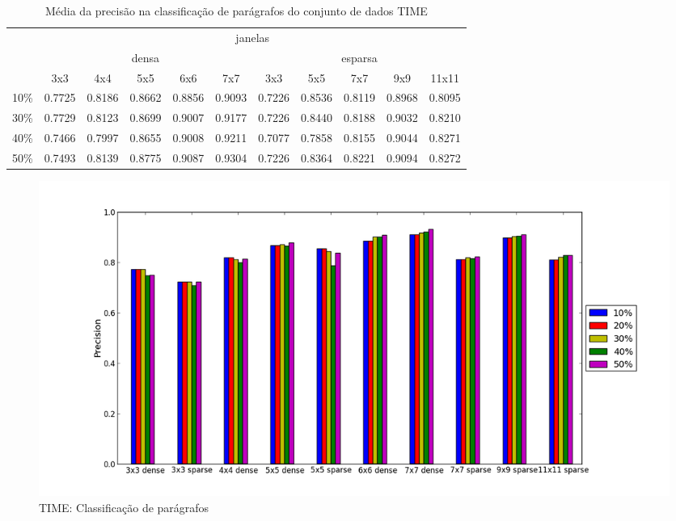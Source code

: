 \documentclass[a4paper,11pt]{article}
\begin{document}
  \begin{center}
    \begin{table}[p]
      \caption{Média da precisão na classificação de parágrafos do conjunto de dados TIME}
      \begin{tabular}{ l | c c c c c || c c c c c | }
        \cline{2-11}
        & \multicolumn{10}{|c|}{janelas} \\
        \cline{2-11}
        & \multicolumn{5}{c||}{densa} & \multicolumn{5}{c|}{esparsa} \\
        \cline{2-11}
        & 3x3 & 4x4 & 5x5 & 6x6 & 7x7 & 3x3 & 5x5 & 7x7 & 9x9 & 11x11 \\
        \hline
        \multicolumn{1}{|l|}{10\%}& 0.7725& 0.8186& 0.8662& 0.8856& 0.9093& 0.7226& 0.8536& 0.8119& 0.8968& 0.8095\\
        \multicolumn{1}{|l|}{30\%}& 0.7729& 0.8123& 0.8699& 0.9007& 0.9177& 0.7226& 0.8440& 0.8188& 0.9032& 0.8210\\
        \multicolumn{1}{|l|}{40\%}& 0.7466& 0.7997& 0.8655& 0.9008& 0.9211& 0.7077& 0.7858& 0.8155& 0.9044& 0.8271\\
        \multicolumn{1}{|l|}{50\%}& 0.7493& 0.8139& 0.8775& 0.9087& 0.9304& 0.7226& 0.8364& 0.8221& 0.9094& 0.8272\\
        \hline  
      \end{tabular}
      \label{tab:time_precision_paragraph}
    \end{table}
  \end{center}

  \begin{figure}[p]
    \centerline{\includegraphics[width=1.2\textwidth]{assets/experiment_charts/time_TextRegion_paragraph_precision.png}}
    \caption{TIME: Classificação de parágrafos}
    \label{fig:time_TextRegion_paragraph_precision}
  \end{figure}  
\end{document}
